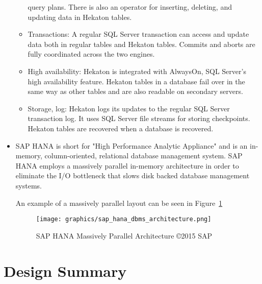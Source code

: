 \documentclass[letterpaper, 12pt]{article}
\begin{document}
\begin{itemize}
\begin{itemize}
  query plans. There is also an operator for inserting, deleting,
  and updating data in Hekaton tables.
  \item Transactions: A regular SQL Server transaction can access
  and update data both in regular tables and Hekaton tables.
  Commits and aborts are fully coordinated across the two engines.
  \item High availability: Hekaton is integrated with AlwaysOn,
  SQL Server’s high availability feature. Hekaton tables in a database
  fail over in the same way as other tables and are also
  readable on secondary servers.
  \item Storage, log: Hekaton logs its updates to the regular SQL
  Server transaction log. It uses SQL Server file streams for storing
  checkpoints. Hekaton tables are recovered when a database is recovered.
  \end{itemize} \cite{hekaton}

  \item SAP HANA
  is short for "High Performance Analytic Appliance" and is an in-memory,
  column-oriented, relational database management system. SAP HANA employs a
  massively parallel in-memory architecture in order to eliminate the I/O bottleneck
  that slows disk backed database management systems.
  \par\vspace{\baselineskip}
  An example of a massively parallel layout can be seen in Figure~\ref{fig:saphana_architecture}
  \begin{figure}
	\centering
	\label{fig:saphana_architecture}	
	\texttt{[image: graphics/sap\_hana\_dbms\_architecture.png]}
    \caption{SAP HANA Massively Parallel Architecture \copyright 2015 SAP \citep{saphana}}
  \end{figure}
  \par\vspace{\baselineskip}
\end{itemize}

\newpage

\section{Design Summary}
\end{document}
